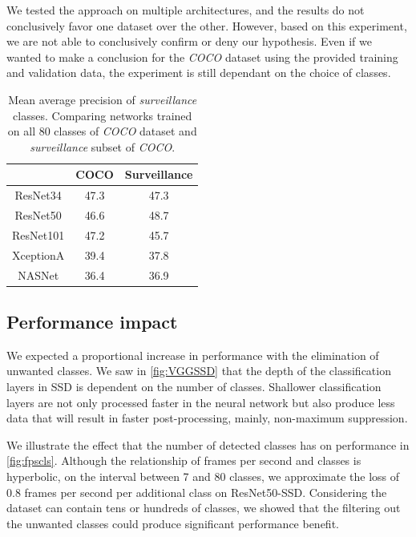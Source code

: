 We tested the approach on multiple architectures, and the results do not conclusively favor one dataset over the other. However, based on this experiment, we are not able to conclusively confirm or deny our hypothesis. Even if we wanted to make a conclusion for the \textit{COCO} dataset using the provided training and validation data, the experiment is still dependant on the choice of classes.

\begin{table}[]
    \centering
    \begin{tabular}{c|c|c}
         & COCO & Surveillance  \\
         \hline
        ResNet34 & 47.3 & 47.3 \\
        ResNet50 & 46.6 & 48.7 \\
        ResNet101 & 47.2 & 45.7 \\
        XceptionA & 39.4 & 37.8 \\
        NASNet & 36.4 & 36.9 
    \end{tabular}
    \caption[SSD's precision comparison between COCO and surveillance datasets]{Mean average precision of \textit{surveillance} classes. Comparing networks trained on all 80 classes of \textit{COCO} dataset and \textit{surveillance} subset of \textit{COCO}.}
    \label{tab:ssdcocosurv}
\end{table}

\subsection{Performance impact}
We expected a proportional increase in performance with the elimination of unwanted classes. We saw in \cref{fig:VGGSSD} that the depth of the classification layers in SSD is dependent on the number of classes. Shallower classification layers are not only processed faster in the neural network but also produce less data that will result in faster post-processing, mainly, non-maximum suppression.

We illustrate the effect that the number of detected classes has on performance in \cref{fig:fpscls}. Although the relationship of frames per second and classes is hyperbolic, on the interval between 7 and 80 classes, we approximate the loss of 0.8 frames per second per additional class on ResNet50-SSD. Considering the dataset can contain tens or hundreds of classes, we showed that the filtering out the unwanted classes could produce significant performance benefit.

